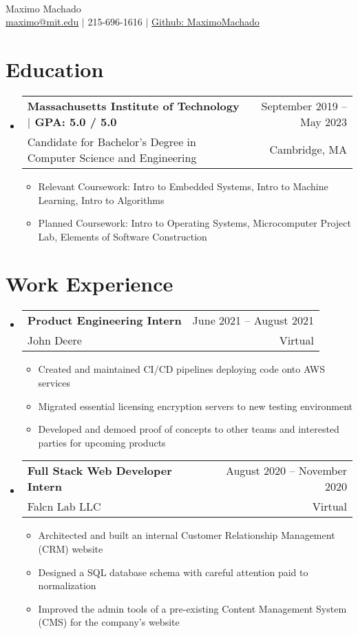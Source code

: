 \documentclass[letterpaper,12pt]{article} %
\makeatletter
\newcommand{\CVItem}[1]{
  \item\small{
    {#1 \vspace{-2pt}}
  }
}
\newcommand{\CVSubheading}[4]{
  \vspace{-2pt}\item
    \begin{tabular*}{0.97\textwidth}[t]{l@{\extracolsep{\fill}}r}
      \textbf{#1} & #2 \\
      \small#3 & \small #4 \\
    \end{tabular*}\vspace{-7pt}
}
\newcommand{\CVSubHeadingListStart}{\begin{itemize}[leftmargin=0.15in, label={}]} %
\newcommand{\CVSubHeadingListEnd}{\end{itemize}}
\newcommand{\CVItemListStart}{\begin{itemize}}
\newcommand{\CVItemListEnd}{\end{itemize}\vspace{-5pt}}
\makeatother
\begin{document}

\begin{minipage}[c]{0.05\textwidth}
  \-\
\end{minipage}

\begin{center}
  \Huge Maximo Machado \\ \vspace{1pt} %
  \small
  \href{mailto:maximo@mit.edu}{maximo@mit.edu} $|$
  215-696-1616 $|$
  \href{https://github.com/MaximoMachado}{Github: MaximoMachado}
\end{center}
\vspace{-17pt} %

\section{Education}
\CVSubHeadingListStart
\CVSubheading
{{Massachusetts Institute of Technology $|$ \small{GPA: 5.0 / 5.0}}}{September 2019 -- May 2023}
{Candidate for Bachelor's Degree in Computer Science and Engineering}{Cambridge, MA}

\CVItemListStart
\CVItem{Relevant Coursework:
  Intro to Embedded Systems,
  Intro to Machine Learning,
  Intro to Algorithms}
\CVItem{Planned Coursework:
  Intro to Operating Systems,
  Microcomputer Project Lab,
  Elements of Software Construction}
\CVItemListEnd
\CVSubHeadingListEnd

\section{Work Experience}
\CVSubHeadingListStart
\CVSubheading
{Product Engineering Intern}{June 2021 -- August 2021}
{John Deere}{Virtual}
\CVItemListStart
\CVItem{Created and maintained CI/CD pipelines deploying code onto AWS services}
\CVItem{Migrated essential licensing encryption servers to new testing environment}
\CVItem{Developed and demoed proof of concepts to other teams and interested parties for upcoming products}
\CVItemListEnd
\CVSubheading
{Full Stack Web Developer Intern}{August 2020 -- November 2020}
{Falcn Lab LLC}{Virtual}
\CVItemListStart
\CVItem{Architected and built an internal Customer Relationship Management (CRM) website}
\CVItem{Designed a SQL database schema with careful attention paid to normalization}
\CVItem{Improved the admin tools of a pre-existing Content Management System (CMS) for the company's website}
\CVItemListEnd
\CVSubHeadingListEnd
\end{document}

